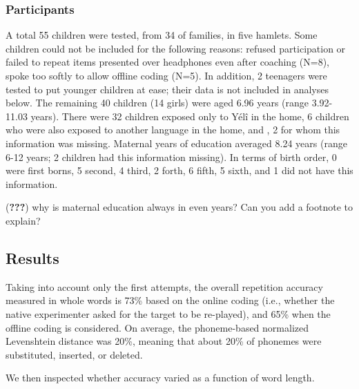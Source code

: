 \documentclass[english,,man,floatsintext]{apa6}
\begin{document}
\hypertarget{participants}{%
\subsubsection{Participants}\label{participants}}

A total 55 children were tested, from 34 of families, in five hamlets. Some children could not be included for the following reasons: refused participation or failed to repeat items presented over headphones even after coaching (N=8), spoke too softly to allow offline coding (N=5). In addition, 2 teenagers were tested to put younger children at ease; their data is not included in analyses below. The remaining 40 children (14 girls) were aged 6.96 years (range 3.92-11.03 years). There were 32 children exposed only to Yélî in the home, 6 children who were also exposed to another language in the home, and , 2 for whom this information was missing. Maternal years of education averaged 8.24 years (range 6-12 years; 2 children had this information missing). In terms of birth order, 0 were first borns, 5 second, 4 third, 2 forth, 6 fifth, 5 sixth, and 1 did not have this information.

({\textbf{???}}) why is maternal education always in even years? Can you add a footnote to explain?

\hypertarget{results}{%
\subsection{Results}\label{results}}

Taking into account only the first attempts, the overall repetition accuracy measured in whole words is 73\% based on the online coding (i.e., whether the native experimenter asked for the target to be re-played), and 65\% when the offline coding is considered. On average, the phoneme-based normalized Levenshtein distance was 20\%, meaning that about 20\% of phonemes were substituted, inserted, or deleted.

We then inspected whether accuracy varied as a function of word length.
\end{document}
